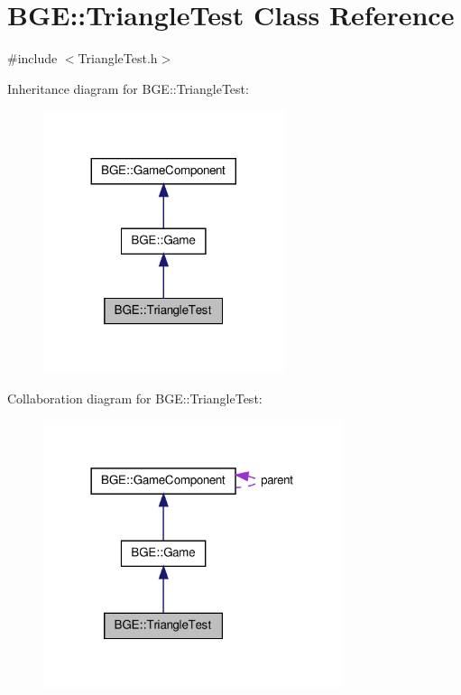 \hypertarget{class_b_g_e_1_1_triangle_test}{\section{B\-G\-E\-:\-:Triangle\-Test Class Reference}
\label{class_b_g_e_1_1_triangle_test}
}


{\ttfamily \#include $<$Triangle\-Test.\-h$>$}



Inheritance diagram for B\-G\-E\-:\-:Triangle\-Test\-:
\nopagebreak
\begin{figure}[H]
\begin{center}
\leavevmode
\includegraphics[width=200pt]{class_b_g_e_1_1_triangle_test__inherit__graph}
\end{center}
\end{figure}


Collaboration diagram for B\-G\-E\-:\-:Triangle\-Test\-:
\nopagebreak
\begin{figure}[H]
\begin{center}
\leavevmode
\includegraphics[width=249pt]{class_b_g_e_1_1_triangle_test__coll__graph}
\end{center}
\end{figure}
